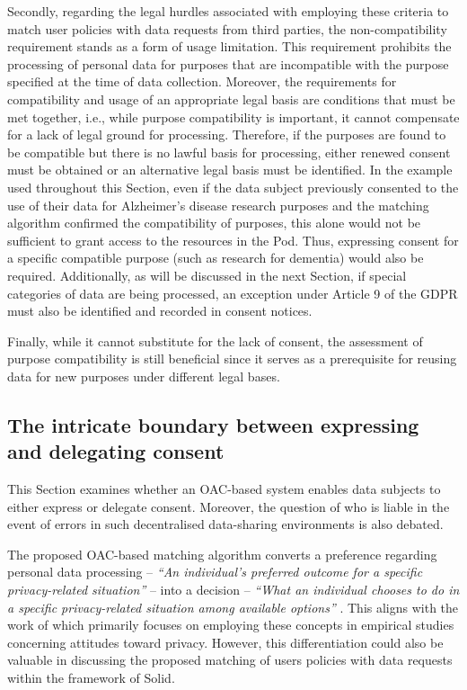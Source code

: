Secondly, regarding the legal hurdles associated with employing these criteria to match user policies with data requests from third parties, the non-compatibility requirement stands as a form of usage limitation.
This requirement prohibits the processing of personal data for purposes that are incompatible with the purpose specified at the time of data collection.
Moreover, the requirements for compatibility and usage of an appropriate legal basis are conditions that must be met together, i.e., while purpose compatibility is important, it cannot compensate for a lack of legal ground for processing.
Therefore, if the purposes are found to be compatible but there is no lawful basis for processing, either renewed consent must be obtained or an alternative legal basis must be identified.
In the example used throughout this Section, even if the data subject previously consented to the use of their data for Alzheimer's disease research purposes and the matching algorithm confirmed the compatibility of purposes, this alone would not be sufficient to grant access to the resources in the Pod.
Thus, expressing consent for a specific compatible purpose (such as research for dementia) would also be required.
Additionally, as will be discussed in the next Section, if special categories of data are being processed, an exception under Article 9 of the GDPR \citeyearpar{noauthor_regulation_2016} must also be identified and recorded in consent notices.

Finally, while it cannot substitute for the lack of consent, the assessment of purpose compatibility is still beneficial since it serves as a prerequisite for reusing data for new purposes under different legal bases.

\subsection{The intricate boundary between expressing and delegating consent}
\label{sec:consent_delegating}

This Section examines whether an OAC-based system enables data subjects to either express or delegate consent.
Moreover, the question of who is liable in the event of errors in such decentralised data-sharing environments is also debated.

The proposed OAC-based matching algorithm converts a preference regarding personal data processing -- \textit{``An individual’s preferred outcome for a specific privacy-related situation''} -- into a decision -- \textit{``What an individual chooses to do in a specific privacy-related situation among available options''} \citep{colnago_is_2022}.
This aligns with the work of \cite{colnago_is_2022} which primarily focuses on employing these concepts in empirical studies concerning attitudes toward privacy.
However, this differentiation could also be valuable in discussing the proposed matching of users policies with data requests within the framework of Solid.

